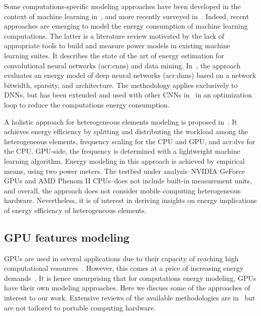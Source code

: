 Some computations-specific modeling approaches have been developed in the context of machine learning in~\citep{yang2017method}, and more recently surveyed in~\citep{garcia2019estimation}. Indeed, recent approaches are emerging to model the energy consumption of machine learning computations. The latter is a literature review motivated by the lack of appropriate tools to build and measure power models in existing machine learning suites. It describes the state of the art of energy estimation for convolutional neural networks (\Gls{acr:cnn}s) and data mining. In~\citep{yang2017method}, the approach evaluates an energy model of deep neural networks (\Gls{acr:dnn}s) based on a network bitwidth, sparsity, and architecture. The methodology applies exclusively to DNNs, but has been extended and used with other CNNs in~\citep{yang2017designing} in an optimization loop to reduce the computations energy consumption.

A holistic approach for heterogeneous elements modeling is proposed in~\citep{ma2012holistic}. It achieves energy efficiency by splitting and distributing the workload among the heterogeneous elements, frequency scaling for the CPU and GPU, and \Gls{acr:dvs} for the CPU. GPU-side, the frequency is determined with a lightweight machine learning algorithm. Energy modeling in this approach is achieved by empirical means, using two power meters. The testbed under analysis--NVIDIA GeForce GPUs and AMD Phenom II CPUs--does not include built-in measurement units, and overall, the approach does not consider mobile computing heterogeneous hardware. Nevertheless, it is of interest in deriving insights on energy implications of energy efficiency of heterogeneous elements. 


\subsection{GPU features modeling}

GPUs are used in several applications due to their capacity of reaching high computational resources~\citep{kasichayanula2012power}. However, this comes at a price of increasing energy demands~\citep{mittal2014survey}. It is hence unsurprising that for computations energy modeling, GPUs have their own modeling approaches. Here we discuss some of the approaches of interest to our work. Extensive reviews of the available methodologies are in~\citep{mittal2014survey,bridges2016understanding,obrien2017survey} but are not tailored to portable computing hardware.

